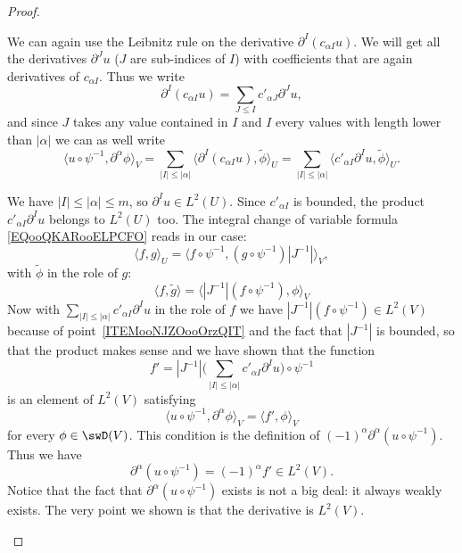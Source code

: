 \begin{proof}
\begin{subproof}
        We can again use the Leibnitz rule on the derivative \( \partial^{I}(c_{\alpha I} u)\). We will get all the derivatives \( \partial^Ju\) (\( J\) are sub-indices of \( I\)) with coefficients that are again derivatives of \( c_{\alpha I}\). Thus we write
        \begin{equation}
            \partial^I(c_{\alpha I}u)=\sum_{J\leq I}c'_{\alpha J}\partial^Ju,
        \end{equation}
        and since \( J\) takes any value contained in \( I\) and \( I\) every values with length lower than \( | \alpha |\) we can as well write
        \begin{equation}
             \langle u\circ\psi^{-1}, \partial^{\alpha}\phi\rangle_V =  \sum_{| I |\leq | \alpha |}\langle \partial^{I}(c_{\alpha I}u), \tilde \phi\rangle_U =\sum_{| I |\leq | \alpha |}\langle c'_{\alpha I}\partial^Iu, \tilde \phi\rangle_U.
        \end{equation}

        We have \( | I |\leq | \alpha |\leq m\), so \( \partial^Iu\in L^2(U)\). Since \( c'_{\alpha I}\) is bounded, the product \( c'_{\alpha I}\partial^Iu\) belongs to \( L^2(U)\) too. The integral change of variable formula \eqref{EQooQKARooELPCFO} reads in our case:
        \begin{equation}
            \langle f, g\rangle_U=\langle f\circ \psi^{-1}, (g\circ\psi^{-1})| J^{-1} |\rangle_V,
        \end{equation}
        with \( \tilde \phi\) in the role of \( g\):
        \begin{equation}
            \langle f, \tilde g\rangle =\langle | J^{-1} |(f\circ\psi^{-1}), \phi\rangle_V
        \end{equation}
        Now with \( \sum_{| I |\leq | \alpha |}c'_{\alpha I}\partial^Iu\) in the role of \( f\) we have \( | J^{-1} |(f\circ\psi^{-1})\in L^2(V)\) because of point~\ref{ITEMooNJZOooOrzQIT} and the fact that \( | J^{-1} |\) is bounded, so that the product makes sense and we have shown that the function
        \begin{equation}
            f'=| J^{-1} |\big( \sum_{| I |\leq | \alpha |}c'_{\alpha I}\partial^Iu \big)\circ\psi^{-1}
        \end{equation}
        is an element of \( L^2(V)\) satisfying
        \begin{equation}
              \langle u\circ\psi^{-1}, \partial^{\alpha}\phi\rangle_V =   \langle f', \phi\rangle_V
        \end{equation}
        for every \( \phi\in\swD(V)\). This condition is the definition of \(   (-1)^{\alpha} \partial^{\alpha}(u\circ\psi^{-1})\). Thus we have
        \begin{equation}
            \partial^{\alpha}(u\circ\psi^{-1})=(-1)^{\alpha}f'\in L^2(V).
        \end{equation}
        Notice that the fact that \( \partial^{\alpha}(u\circ\psi^{-1})\) exists is not a big deal: it always weakly exists. The very point we shown is that the derivative is \( L^2(V)\).


\end{subproof}
\end{proof}
